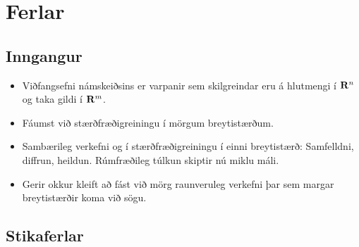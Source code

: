 
\theoremstyle{definition}
\newtheorem{exercise}[theorem]{}





\newbox\mytempbox
\newdimen\mytempdimen

\newcommand\includegraphicscopyright[3][]{%
  \leavevmode\vbox{\vskip3pt\raggedright\setbox\mytempbox=\hbox{\texttt{[image: \#2]}}%
    \mytempdimen=\wd\mytempbox\box\mytempbox\par\vskip1pt%
    \fontsize{3}{3.5}\selectfont{\color{black!25}{\vbox{\hsize=\mytempdimen#3}}}\vskip3pt%
}}

\newenvironment{colortabular}[1]{\medskip\rowcolors[]{1}{blue!20}{blue!10}\tabular{#1}\rowcolor{blue!40}}{\endtabular\medskip}

\def\equad{\leavevmode\hbox{}\quad}

\newenvironment{greencolortabular}[1]
{\medskip\rowcolors[]{1}{green!50!black!20}{green!50!black!10}%
  \tabular{#1}\rowcolor{green!50!black!40}}%
{\endtabular\medskip}




\section{Ferlar}
\subsection{Inngangur}
\begin {itemize}
 \item Viðfangsefni námskeiðsins er varpanir sem skilgreindar eru á
hlutmengi í $\mbox{${\bf R}^n$}$ og taka gildi í $\mbox{${\bf R}^m$}$. 
\item Fáumst við stærðfræðigreiningu í mörgum breytistærðum.
\item Sambærileg verkefni og í stærðfræðigreiningu í einni breytistærð: Samfelldni, diffrun, heildun. Rúmfræðileg túlkun skiptir nú miklu máli.
\item 
Gerir okkur kleift að fást við mörg raunveruleg verkefni þar sem margar breytistærðir koma við sögu.
\end {itemize}




\subsection{Stikaferlar} 

